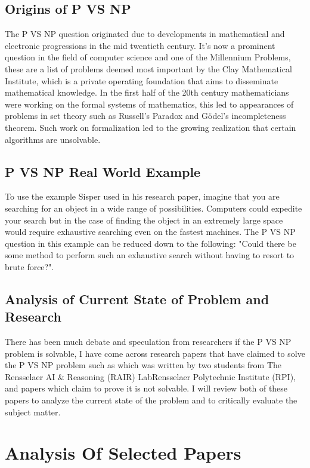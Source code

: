 \documentclass{report}
\begin{document}
\section{Origins of P VS NP}
The P VS NP question originated due to developments in mathematical and electronic progressions in the mid twentieth century\cite{HistoryOfPVsNP}. It's now a prominent question in the field of computer science and one of the Millennium Problems\cite{Millennium}, these are a list of problems deemed most important by the Clay Mathematical Institute, which is a private operating foundation that aims to disseminate mathematical knowledge\cite{AboutMillennium}.  In the first half of the 20th century mathematicians were working on the formal systems of mathematics\cite{ResearchPaperFormalizeMathematics}, this led to appearances of problems in set theory such as Russell's Paradox\cite{RussellParadox} and Gödel's incompleteness theorem\cite{Godel}. Such work on formalization led to the growing realization that certain algorithms are unsolvable\cite{HistoryOfPVsNP}.
\section{P VS NP Real World Example}
To use the example Sisper used in his research paper\cite{HistoryOfPVsNP}, imagine that you are searching for an object in a wide range of possibilities.  Computers could expedite your search but in the case of finding the object in an extremely large space would require exhaustive searching even on the fastest machines.  The P VS NP question in this example can be reduced down to the following: "Could there be some method to perform such an exhaustive search without having to resort to brute force?".
\section{Analysis of Current State of Problem and Research}
There has been much debate and speculation from researchers if the P VS NP problem is solvable, I have come across research papers that have claimed to solve the P VS NP problem such as\cite{PVsNPSolved} which was written by two students from The Rensselaer AI \& Reasoning (RAIR) LabRensselaer Polytechnic Institute (RPI), and papers which claim to prove it is not solvable\cite{P!=NP}. I will review both of these papers to analyze the current state of the problem and to critically evaluate the subject matter.
\chapter{Analysis Of Selected Papers}
\end{document}
